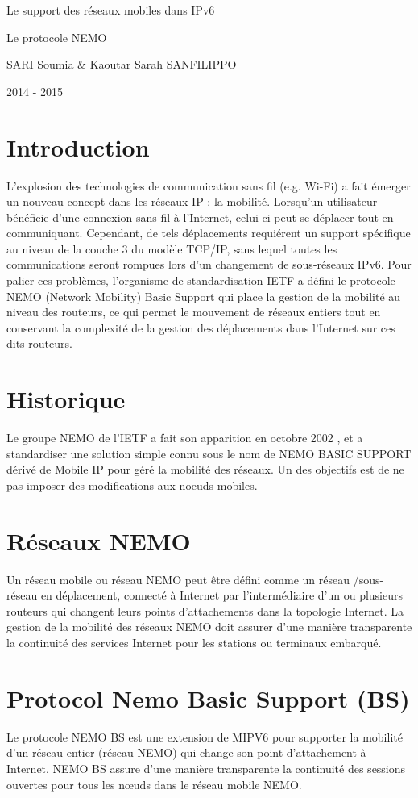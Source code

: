 \documentclass[12pt,a4paper]{report}
\newcommand{\myTitle}{
\begingroup 
\centering 


\vspace{\stretch{1}}
{\LARGE Le support des r\'{e}seaux mobiles dans IPv6}%

\vspace*{1\baselineskip}

\LARGE %
Le protocole NEMO
\vspace{\stretch{2}}

\vspace{\stretch{1}}
{\Large SARI Soumia \& Kaoutar Sarah SANFILIPPO\par} 
\vspace{\stretch{2}}

\vspace{\stretch{1}}
{\large 2014 - 2015}
\vspace{\stretch{2}}%
\setcounter{page}{0}

\endgroup}
\begin{document}
\thispagestyle{empty}
\myTitle

\renewcommand{\contentsname}{Sommaire}
\tableofcontents

\newpage
\section{Introduction}

L'explosion des technologies de communication sans fil (e.g. Wi-Fi) a fait \'{e}merger un nouveau
concept dans les r\'{e}seaux IP : la mobilit\'{e}. Lorsqu'un utilisateur b\'{e}n\'{e}ficie d'une connexion sans fil \`a
l'Internet, celui-ci peut se d\'{e}placer tout en communiquant. Cependant, de tels d\'{e}placements
requi\'{e}rent un support sp\'{e}cifique au niveau de la couche 3 du mod\`{e}le TCP/IP, sans lequel toutes les
communications seront rompues lors d'un changement de sous-r\'{e}seaux IPv6. Pour palier ces
probl\`{e}mes, l'organisme de standardisation IETF a d\'{e}fini le protocole NEMO (Network Mobility) Basic
Support qui place la gestion de la mobilit\'{e} au niveau des routeurs, ce qui permet le mouvement de
r\'{e}seaux entiers tout en conservant la complexit\'{e} de la gestion des d\'{e}placements dans l'Internet sur
ces dits routeurs.\cite{ref}

\section{Historique}

Le groupe NEMO de l'IETF a fait son apparition en octobre 2002 , et a standardiser une solution simple connu sous
le nom de NEMO BASIC SUPPORT d\'eriv\'e de Mobile IP pour g\'er\'e la mobilit\'e des r\'eseaux.
Un des objectifs est de ne pas imposer des modifications aux noeuds mobiles.
 
\section{R\'eseaux NEMO}
Un r\'eseau mobile ou r\'eseau NEMO peut \^etre d\'efini comme un r\'eseau /sous-r\'eseau en d\'eplacement, connect\'e \`a Internet par l'interm\'ediaire d'un ou plusieurs routeurs qui changent leurs points d'attachements dans la topologie Internet. La gestion de la mobilit\'e des r\'eseaux NEMO doit assurer d'une mani\`ere transparente la continuit\'e des services Internet  pour les stations ou terminaux embarqu\'e.

\section{Protocol Nemo  Basic Support (BS)}
Le protocole NEMO BS est une extension de MIPV6 pour supporter la mobilit\'{e} d'un 
r\'{e}seau entier (r\'{e}seau NEMO) qui change son point d'attachement \`{a} Internet. NEMO BS  assure d'une mani\`ere transparente la continuit\'e des sessions ouvertes pour tous les nœuds dans le r\'eseau mobile NEMO.
\end{document}
